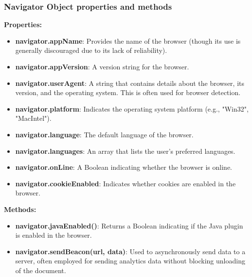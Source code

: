 \documentclass{report}
\begin{document}
    \subsubsection{Navigator Object properties and methods}
    \textbf{Properties:}
    \begin{itemize}
        \item \textbf{navigator.appName}: Provides the name of the browser (though its use is generally discouraged due to its lack of reliability).
        \item \textbf{navigator.appVersion}: A version string for the browser.
        \item \textbf{navigator.userAgent}: A string that contains details about the browser, its version, and the operating system. This is often used for browser detection.
        \item \textbf{navigator.platform}: Indicates the operating system platform (e.g., "Win32", "MacIntel").
        \item \textbf{navigator.language}: The default language of the browser.
        \item \textbf{navigator.languages}: An array that lists the user's preferred languages.
        \item \textbf{navigator.onLine}: A Boolean indicating whether the browser is online.
        \item \textbf{navigator.cookieEnabled}: Indicates whether cookies are enabled in the browser. 
    \end{itemize}
    \bigbreak \noindent 
    \textbf{Methods:}
    \begin{itemize}
        \item \textbf{navigator.javaEnabled()}: Returns a Boolean indicating if the Java plugin is enabled in the browser.
        \item \textbf{navigator.sendBeacon(url, data)}: Used to asynchronously send data to a server, often employed for sending analytics data without blocking unloading of the document.
    \end{itemize}

    \bigbreak \noindent 
\end{document}

